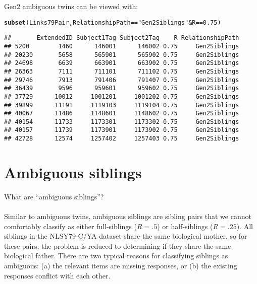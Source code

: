 \documentclass[letter]{article}\usepackage{graphicx, color}
\makeatletter
\newcommand{\hlfunctioncall}[1]{\textcolor[rgb]{0.501960784313725,0,0.329411764705882}{\textbf{#1}}}%
\newcommand{\hlstring}[1]{\textcolor[rgb]{0.6,0.6,1}{#1}}%
\newenvironment{kframe}{%
 \def\at@end@of@kframe{}%
 \ifinner\ifhmode%
  \def\at@end@of@kframe{\end{minipage}}%
  \begin{minipage}{\columnwidth}%
 \fi\fi%
 \def\FrameCommand##1{\hskip\@totalleftmargin \hskip-\fboxsep
 \colorbox{shadecolor}{##1}\hskip-\fboxsep
     \hskip-\linewidth \hskip-\@totalleftmargin \hskip\columnwidth}%
 \MakeFramed {\advance\hsize-\width
   \@totalleftmargin\z@ \linewidth\hsize
   \@setminipage}}%
 {\par\unskip\endMakeFramed%
 \at@end@of@kframe}
\newenvironment{knitrout}{}{} %
\makeatother
\begin{document}
Gen2 ambiguous twins can be viewed with:
\begin{knitrout}
\color{fgcolor}\begin{kframe}
\begin{alltt}
\hlfunctioncall{subset}(Links79Pair, RelationshipPath == \hlstring{"Gen2Siblings"} & R == 0.75)
\end{alltt}
\begin{verbatim}
##       ExtendedID Subject1Tag Subject2Tag    R RelationshipPath
## 5200        1460      146001      146002 0.75     Gen2Siblings
## 20230       5658      565901      565902 0.75     Gen2Siblings
## 24698       6639      663901      663902 0.75     Gen2Siblings
## 26363       7111      711101      711102 0.75     Gen2Siblings
## 29746       7913      791406      791407 0.75     Gen2Siblings
## 36439       9596      959601      959602 0.75     Gen2Siblings
## 37729      10012     1001201     1001202 0.75     Gen2Siblings
## 39899      11191     1119103     1119104 0.75     Gen2Siblings
## 40067      11486     1148601     1148602 0.75     Gen2Siblings
## 40154      11733     1173301     1173302 0.75     Gen2Siblings
## 40157      11739     1173901     1173902 0.75     Gen2Siblings
## 42728      12574     1257402     1257403 0.75     Gen2Siblings
\end{verbatim}
\end{kframe}
\end{knitrout}

% 

\section{Ambiguous siblings}
\textsf{What are  ``ambiguous siblings''?}\\ \\
Similar to ambiguous twins, ambiguous siblings are sibling pairs that we cannot comfortably classify as either full-siblings ($R=.5$) or half-siblings ($R=.25$).  All siblings in the NLSY79-C/YA dataset share the same biological mother, so for these pairs, the problem is reduced to determining if they share the same biological father.  There are two typical reasons for classifying siblings as ambiguous: (a) the relevant items are missing responses, or (b) the existing responses conflict with each other.  
\end{document}
